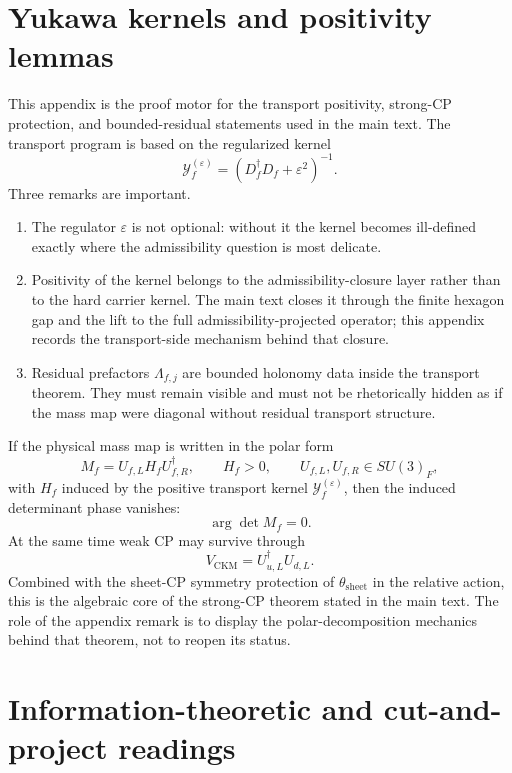 \section{Yukawa kernels and positivity lemmas}
\label{app:yukawa}

This appendix is the proof motor for the transport positivity, strong-CP protection, and bounded-residual statements used in the main text. The transport program is based on the regularized kernel
\[
\mathcal Y_f^{(\varepsilon)}=(D_f^\dagger D_f+\varepsilon^2)^{-1}.
\]
Three remarks are important.
\begin{enumerate}[leftmargin=1.5em, topsep=3pt, itemsep=3pt]
    \item The regulator $\varepsilon$ is not optional: without it the kernel becomes ill-defined exactly where the admissibility question is most delicate.
    \item Positivity of the kernel belongs to the admissibility-closure layer rather than to the hard carrier kernel. The main text closes it through the finite hexagon gap and the lift to the full admissibility-projected operator; this appendix records the transport-side mechanism behind that closure.
    \item Residual prefactors $\Lambda_{f,j}$ are bounded holonomy data inside the transport theorem. They must remain visible and must not be rhetorically hidden as if the mass map were diagonal without residual transport structure.
\end{enumerate}

\begin{remark}
If the physical mass map is written in the polar form
\[
M_f=U_{f,L}H_fU_{f,R}^\dagger,
\qquad
H_f>0,
\qquad
U_{f,L},U_{f,R}\in SU(3)_F,
\]
with $H_f$ induced by the positive transport kernel $\mathcal Y_f^{(\varepsilon)}$, then the induced determinant phase vanishes:
\[
\arg\det M_f=0.
\]
At the same time weak CP may survive through
\[
V_{\mathrm{CKM}}=U_{u,L}^\dagger U_{d,L}.
\]
Combined with the sheet-CP symmetry protection of $\theta_{\mathrm{sheet}}$ in the relative action, this is the algebraic core of the strong-CP theorem stated in the main text. The role of the appendix remark is to display the polar-decomposition mechanics behind that theorem, not to reopen its status.
\end{remark}

\section{Information-theoretic and cut-and-project readings}
\label{app:info-readings}

